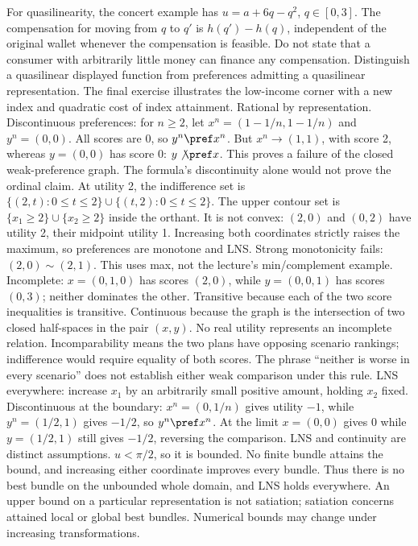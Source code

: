\documentclass[11pt,a4paper]{article}
\begin{document}
For quasilinearity, the concert example has $u=a+6q-q^2$, $q\in[0,3]$. The compensation for moving from $q$ to $q'$ is $h(q')-h(q)$, independent of the original wallet whenever the compensation is feasible. Do not state that a consumer with arbitrarily little money can finance any compensation. Distinguish a quasilinear displayed function from preferences admitting a quasilinear representation. The final exercise illustrates the low-income corner with a new index and quadratic cost of index attainment.
Rational by representation. Discontinuous preferences: for $n\ge2$, let $x^n=(1-1/n,1-1/n)$ and $y^n=(0,0)$. All scores are 0, so $y^n\pref x^n$. But $x^n\to(1,1)$, with score 2, whereas $y=(0,0)$ has score 0: $y\not\pref x$. This proves a failure of the closed weak-preference graph. The formula's discontinuity alone would not prove the ordinal claim.
At utility 2, the indifference set is $\{(2,t):0\le t\le2\}\cup\{(t,2):0\le t\le2\}$. The upper contour set is $\{x_1\ge2\}\cup\{x_2\ge2\}$ inside the orthant. It is not convex: $(2,0)$ and $(0,2)$ have utility 2, their midpoint utility 1. Increasing both coordinates strictly raises the maximum, so preferences are monotone and LNS. Strong monotonicity fails: $(2,0)\sim(2,1)$. This uses max, not the lecture's min/complement example.
Incomplete: $x=(0,1,0)$ has scores $(2,0)$, while $y=(0,0,1)$ has scores $(0,3)$; neither dominates the other. Transitive because each of the two score inequalities is transitive. Continuous because the graph is the intersection of two closed half-spaces in the pair $(x,y)$. No real utility represents an incomplete relation. Incomparability means the two plans have opposing scenario rankings; indifference would require equality of both scores. The phrase ``neither is worse in every scenario'' does not establish either weak comparison under this rule.
LNS everywhere: increase $x_1$ by an arbitrarily small positive amount, holding $x_2$ fixed. Discontinuous at the boundary: $x^n=(0,1/n)$ gives utility $-1$, while $y^n=(1/2,1)$ gives $-1/2$, so $y^n\pref x^n$. At the limit $x=(0,0)$ gives 0 while $y=(1/2,1)$ still gives $-1/2$, reversing the comparison. LNS and continuity are distinct assumptions.
$u<\pi/2$, so it is bounded. No finite bundle attains the bound, and increasing either coordinate improves every bundle. Thus there is no best bundle on the unbounded whole domain, and LNS holds everywhere. An upper bound on a particular representation is not satiation; satiation concerns attained local or global best bundles. Numerical bounds may change under increasing transformations.
\end{document}
